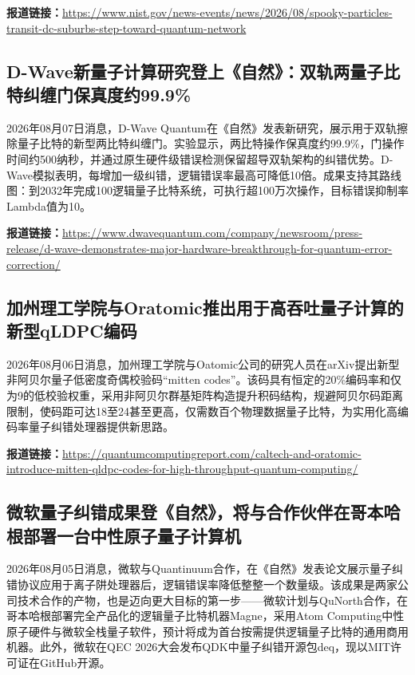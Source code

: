 \documentclass[12pt,a4paper]{ctexart}
\begin{document}
\noindent\textbf{报道链接：}\url{https://www.nist.gov/news-events/news/2026/08/spooky-particles-transit-dc-suburbs-step-toward-quantum-network}

\subsection{ D-Wave新量子计算研究登上《自然》：双轨两量子比特纠缠门保真度约99.9\% }

2026年08月07日消息，D-Wave Quantum在《自然》发表新研究，展示用于双轨擦除量子比特的新型两比特纠缠门。实验显示，两比特操作保真度约99.9\%，门操作时间约500纳秒，并通过原生硬件级错误检测保留超导双轨架构的纠错优势。D-Wave模拟表明，每增加一级纠错，逻辑错误率最高可降低10倍。成果支持其路线图：到2032年完成100逻辑量子比特系统，可执行超100万次操作，目标错误抑制率Lambda值为10。

\noindent\textbf{报道链接：}\url{https://www.dwavequantum.com/company/newsroom/press-release/d-wave-demonstrates-major-hardware-breakthrough-for-quantum-error-correction/}

\subsection{ 加州理工学院与Oratomic推出用于高吞吐量子计算的新型qLDPC编码 }

2026年08月06日消息，加州理工学院与Oatomic公司的研究人员在arXiv提出新型非阿贝尔量子低密度奇偶校验码“mitten codes”。该码具有恒定的20\%编码率和仅为9的低校验权重，采用非阿贝尔群基矩阵构造提升积码结构，规避阿贝尔码距离限制，使码距可达18至24甚至更高，仅需数百个物理数据量子比特，为实用化高编码率量子纠错处理器提供新思路。

\noindent\textbf{报道链接：}\url{https://quantumcomputingreport.com/caltech-and-oratomic-introduce-mitten-qldpc-codes-for-high-throughput-quantum-computing/}

\subsection{ 微软量子纠错成果登《自然》，将与合作伙伴在哥本哈根部署一台中性原子量子计算机 }

2026年08月05日消息，微软与Quantinuum合作，在《自然》发表论文展示量子纠错协议应用于离子阱处理器后，逻辑错误率降低整整一个数量级。该成果是两家公司技术合作的产物，也是迈向更大目标的第一步——微软计划与QuNorth合作，在哥本哈根部署完全产品化的逻辑量子比特机器Magne，采用Atom Computing中性原子硬件与微软全栈量子软件，预计将成为首台按需提供逻辑量子比特的通用商用机器。此外，微软在QEC 2026大会发布QDK中量子纠错开源包deq，现以MIT许可证在GitHub开源。
\end{document}
